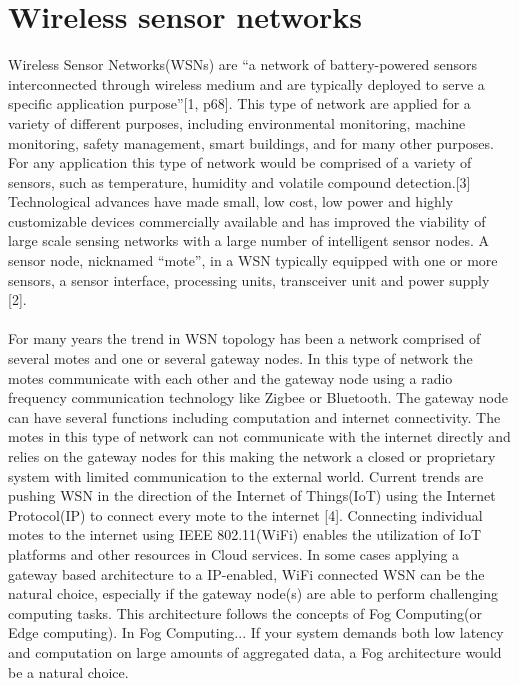 \documentclass[]{uiophd}
\begin{document}
\section{Wireless sensor networks}
Wireless Sensor Networks(WSNs) are “a network of battery-powered sensors interconnected through wireless medium and are typically deployed to serve a specific application purpose”[1, p68]. This type of network are applied for a variety of different purposes, including environmental monitoring, machine monitoring, safety management, smart buildings, and for many other purposes. For any application this type of network would be comprised of a variety of sensors, such as temperature, humidity and volatile compound detection.[3] Technological advances have made small, low cost, low power and highly customizable devices commercially available and has improved the viability of large scale sensing networks with a large number of intelligent sensor nodes. A sensor node, nicknamed “mote”, in a WSN typically equipped with one or more sensors, a sensor interface, processing units, transceiver unit and power supply [2]. 
\\\\
For many years the trend in WSN topology has been a network comprised of several motes and one or several gateway nodes. In this type of network the motes communicate with each other and the gateway node using a radio frequency communication technology like Zigbee or Bluetooth. The gateway node can have several functions including computation and internet connectivity. The motes in this type of network can not communicate with the internet directly and relies on the gateway nodes for this making the network a closed or proprietary system with limited communication to the external world. Current trends are pushing WSN in the direction of the Internet of Things(IoT) using the Internet Protocol(IP) to connect every mote to the internet [4]. Connecting individual motes to the internet using  IEEE 802.11(WiFi) enables the utilization of IoT platforms and other resources in Cloud services. In some cases applying a gateway based architecture to a IP-enabled, WiFi connected WSN can be the natural choice, especially if the gateway node(s) are able to perform challenging computing tasks. This architecture follows the concepts of Fog Computing(or Edge computing). In Fog Computing... If your system demands both low latency and computation on large amounts of aggregated data, a Fog architecture would be a natural choice. 
\\\\
\end{document}
